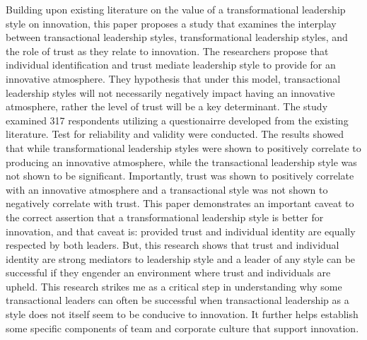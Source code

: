 \begin{adjustwidth}{1in}{}
  \begin{hangpara}{.25in}{1}
\end{hangpara}
\end{adjustwidth}
Building upon existing literature on the value of a transformational leadership style on innovation, this paper proposes a study that examines the interplay between transactional leadership styles, transformational leadership styles, and the role of trust as they relate to innovation. The researchers propose that individual identification and trust mediate leadership style to provide for an innovative atmosphere. They hypothesis that under this model, transactional leadership styles will not necessarily negatively impact having an innovative atmosphere, rather the level of trust will be a key determinant. The study examined 317 respondents utilizing a questionairre developed from the existing literature. Test for reliability and validity were conducted. The results showed that while transformational leadership styles were shown to positively correlate to producing an innovative atmosphere, while the transactional leadership style was not shown to be significant. Importantly, trust was shown to positively correlate with an innovative atmosphere and a transactional style was not shown to negatively correlate with trust. This paper demonstrates an important caveat to the correct assertion that a transformational leadership style is better for innovation, and that caveat is: provided trust and individual identity are equally respected by both leaders. But, this research shows that trust and individual identity are strong mediators to leadership style and a leader of any style can be successful if they engender an environment where trust and individuals are upheld. This research strikes me as a critical step in understanding why some transactional leaders can often be successful when transactional leadership as a style does not itself seem to be conducive to innovation. It further helps establish some specific components of team and corporate culture that support innovation.


